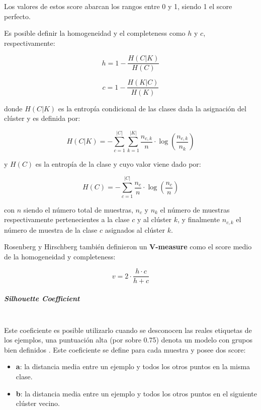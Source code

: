 Los valores de estos score abarcan los rangos entre 0 y 1, siendo 1 el score perfecto.

Es posible definir la homogeneidad y el completeness como $h$ y $c$, respectivamente:

\begin{equation}	
	h = 1 - \frac{H(C|K)}{H(C)}	
\end{equation}

\begin{equation}
	c = 1 - \frac{H(K|C)}{H(K)}
\end{equation}

donde $H(C|K)$ es la entropía condicional de las clases dada la asignación del clúster y es definida por:

\begin{equation}	
	H(C|K) = - \sum_{c=1}^{|C|} \sum_{k=1}^{|K|} \frac{n_{c,k}}{n} \cdot \log(\frac{n_{c,k}}{n_k})
\end{equation}

y $H(C)$ es la entropía de la clase y cuyo valor viene dado por:

\begin{equation}	
	H(C) = - \sum_{c=1}^{|C|} \frac{n_c}{n} \cdot \log(\frac{n_c}{n})
\end{equation}

con $n$ siendo el número total de muestras, $n_c$ y $n_k$ el número de muestras respectivamente pertenecientes a la clase $c$ y al clúster $k$, y finalmente $n_{c,k}$ el número de muestra de la clase $c$ asignados al clúster $k$.

Rosenberg y Hirschberg \cite{rosenberg2007v} también definieron un \textbf{V-measure} como el score medio de la homogeneidad y completeness:

\begin{equation}	
	v = 2 \cdot \frac{h \cdot c}{h + c}
\end{equation}

\subparagraph{Silhouette Coefficient\\\\}

Este coeficiente es posible utilizarlo cuando se desconocen las reales etiquetas de los ejemplos, una puntuación alta (por sobre 0.75) denota un modelo con grupos bien definidos \cite{rousseeuw1987silhouettes}. Este coeficiente se define para cada muestra y posee dos score:

\begin{itemize}
	
	\item \textbf{a}: la distancia media entre un ejemplo y todos los otros puntos en la misma clase.
	
	\item \textbf{b}: la distancia media entre un ejemplo y todos los otros puntos en el siguiente clúster vecino.
\end{itemize}

